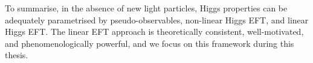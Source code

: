 To summarise, in the absence of new light particles, Higgs properties
can be adequately parametrised by pseudo-observables, non-linear Higgs
EFT, and linear Higgs EFT. The linear EFT approach is theoretically
consistent, well-motivated, and phenomenologically powerful, and we
focus on this framework during this thesis.




